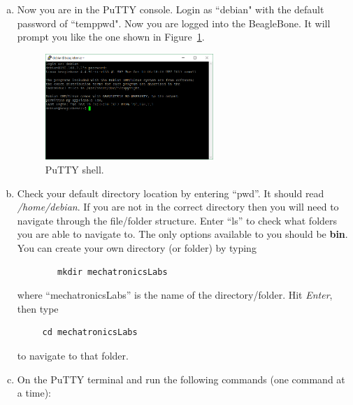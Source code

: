 \begin{enumerate}[a)]
    
  \item Now you are in the PuTTY console. Login as ``debian" with the default
    password of ``temppwd". Now you are logged into the BeagleBone. It will prompt
    you like the one shown in Figure~\ref{fig:PuTTYcons}. %
%
    \begin{figure}[H]
        \centering
        \includegraphics[width= 0.6\textwidth]{figs/img/Lab0/PuTTY_Console.png}
        \caption{PuTTY shell.}
        \label{fig:PuTTYcons}
    \end{figure}
    \item  Check your default directory location by entering ``pwd''. It should
      read \emph{/home/debian}. If you are not in the correct directory then you
      will need to navigate through the file/folder structure. Enter ``ls'' to check what folders you are able to navigate to. The only options available to you should be \textbf{bin}. You can create your own directory (or folder) by typing 
    \begin{verbatim}
        mkdir mechatronicsLabs
    \end{verbatim}
      where ``mechatronicsLabs'' is the name of the directory/folder. Hit \emph{Enter}, then type %
\begin{verbatim}
     cd mechatronicsLabs
\end{verbatim}
%
      to navigate to that folder.
    
    \item On the PuTTY terminal and run the following commands (one command at a time):
    

\end{enumerate}
